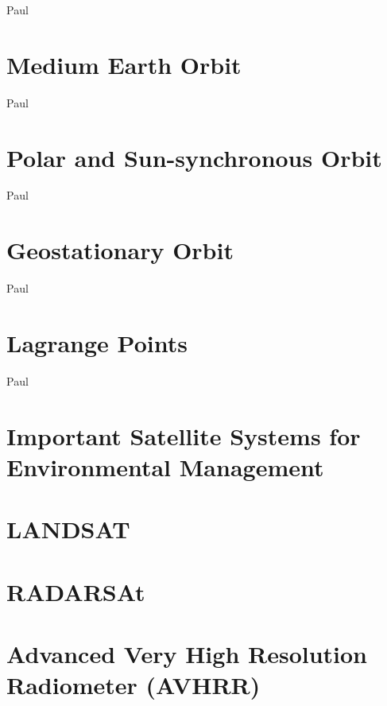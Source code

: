 \documentclass[
]{book}
\begin{document}
Paul

\hypertarget{medium-earth-orbit}{%
\section{Medium Earth Orbit}\label{medium-earth-orbit}}

Paul

\hypertarget{polar-and-sun-synchronous-orbit}{%
\section{Polar and Sun-synchronous Orbit}\label{polar-and-sun-synchronous-orbit}}

Paul

\hypertarget{geostationary-orbit}{%
\section{Geostationary Orbit}\label{geostationary-orbit}}

Paul

\hypertarget{lagrange-points}{%
\section{Lagrange Points}\label{lagrange-points}}

Paul

\hypertarget{important-satellite-systems-for-environmental-management}{%
\section{Important Satellite Systems for Environmental Management}\label{important-satellite-systems-for-environmental-management}}

\hypertarget{landsat}{%
\section{LANDSAT}\label{landsat}}

\hypertarget{radarsat}{%
\section{RADARSAt}\label{radarsat}}

\hypertarget{advanced-very-high-resolution-radiometer-avhrr}{%
\section{Advanced Very High Resolution Radiometer (AVHRR)}\label{advanced-very-high-resolution-radiometer-avhrr}}
\end{document}
